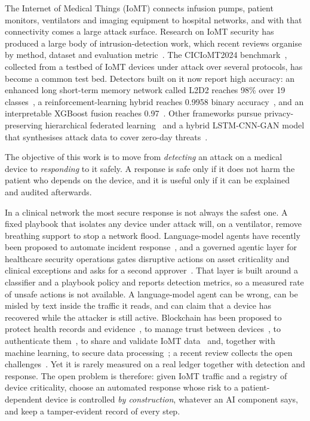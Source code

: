 \documentclass[preprint,12pt]{elsarticle}
\begin{document}
The Internet of Medical Things (IoMT) connects infusion pumps, patient monitors, ventilators and imaging equipment to hospital networks, and with that connectivity comes a large attack surface. Research on IoMT security has produced a large body of intrusion-detection work, which recent reviews organise by method, dataset and evaluation metric~\cite{naghib2025}. The CICIoMT2024 benchmark~\cite{dadkhah2024}, collected from a testbed of IoMT devices under attack over several protocols, has become a common test bed. Detectors built on it now report high accuracy: an enhanced long short-term memory network called L2D2 reaches 98\% over 19 classes~\cite{akar2025}, a reinforcement-learning hybrid reaches 0.9958 binary accuracy~\cite{shaikh2025}, and an interpretable XGBoost fusion reaches 0.97~\cite{hafid2025}. Other frameworks pursue privacy-preserving hierarchical federated learning~\cite{loganathan2025hfl} and a hybrid LSTM-CNN-GAN model that synthesises attack data to cover zero-day threats~\cite{loganathan2025gan}.

The objective of this work is to move from \emph{detecting} an attack on a medical device to \emph{responding} to it safely. A response is safe only if it does not harm the patient who depends on the device, and it is useful only if it can be explained and audited afterwards.

In a clinical network the most secure response is not always the safest one. A fixed playbook that isolates any device under attack will, on a ventilator, remove breathing support to stop a network flood. Language-model agents have recently been proposed to automate incident response~\cite{lin2025,gao2026}, and a governed agentic layer for healthcare security operations gates disruptive actions on asset criticality and clinical exceptions and asks for a second approver~\cite{kolluru2026}. That layer is built around a classifier and a playbook policy and reports detection metrics, so a measured rate of unsafe actions is not available. A language-model agent can be wrong, can be misled by text inside the traffic it reads, and can claim that a device has recovered while the attacker is still active. Blockchain has been proposed to protect health records and evidence~\cite{hasnain2023,pelekoudas2023}, to manage trust between devices~\cite{akkal2025}, to authenticate them~\cite{chaudhuri2026}, to share and validate IoMT data~\cite{ali2025,arul2024} and, together with machine learning, to secure data processing~\cite{khan2025}; a recent review collects the open challenges~\cite{uddin2025}. Yet it is rarely measured on a real ledger together with detection and response. The open problem is therefore: given IoMT traffic and a registry of device criticality, choose an automated response whose risk to a patient-dependent device is controlled \emph{by construction}, whatever an AI component says, and keep a tamper-evident record of every step.
\end{document}
